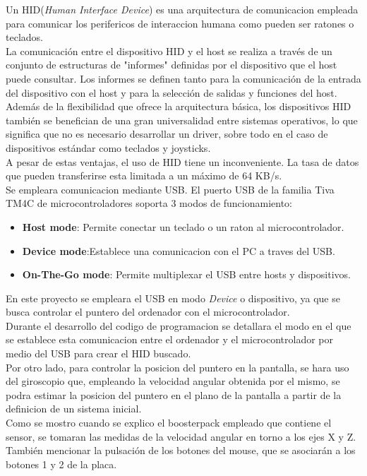 \documentclass[a4paper,twoside]{article}
\begin{document}
Un HID(\textit{Human Interface Device}) es una arquitectura de comunicacion empleada para comunicar los perifericos de interaccion humana como pueden ser ratones o teclados.\\
La comunicación entre el dispositivo HID y el host se realiza a través de un conjunto de estructuras de "informes" definidas por el dispositivo que el host puede consultar. Los informes se definen tanto para la comunicación de la entrada del dispositivo con el host y para la selección de salidas y funciones del host. \\

Además de la flexibilidad que ofrece la arquitectura básica, los dispositivos HID también se benefician de una gran universalidad entre sistemas operativos, lo que significa que no es necesario desarrollar un driver, sobre todo en el caso de dispositivos estándar como teclados y joysticks.\\
A pesar de estas ventajas, el uso de HID tiene un inconveniente. La tasa de datos que pueden transferirse esta limitada a un máximo de 64 KB/s.\\

Se empleara comunicacion mediante USB. El puerto USB de la familia Tiva TM4C de microcontroladores soporta 3 modos de funcionamiento:
\begin{itemize}
	\item \textbf{Host mode}: Permite conectar un teclado o un raton al microcontrolador.
	\item \textbf{Device mode}:Establece una comunicacion con el PC a traves del USB.
	\item \textbf{On-The-Go mode}: Permite multiplexar el USB entre hosts y dispositivos.
\end{itemize}
En este proyecto se empleara el USB en modo \textit{Device} o dispositivo, ya que se busca controlar el puntero del ordenador con el microcontrolador.\\
Durante el desarrollo del codigo de programacion se detallara el modo en el que se establece esta comunicacion entre el ordenador y el microcontrolador por medio del USB para crear el HID buscado. \\

Por otro lado, para controlar la posicion del puntero en la pantalla, se hara uso del giroscopio que, empleando la velocidad angular obtenida por el mismo, se podra estimar la posicion del puntero en el plano de la pantalla a partir de la definicion de un sistema inicial. \\
Como se mostro cuando se explico el boosterpack empleado que contiene el sensor, se tomaran las medidas de la velocidad angular en torno a los ejes X y Z. \\
También mencionar la pulsación de los botones del mouse, que se asociarán a los botones 1 y 2 de la placa.
\end{document}
